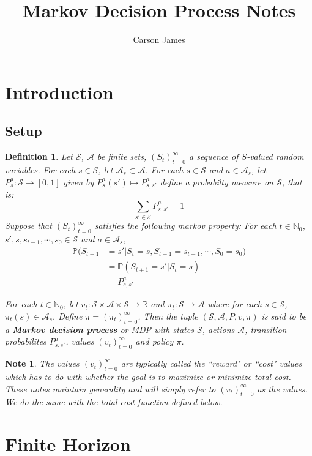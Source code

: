 \documentclass[12pt]{amsart}
\newtheorem{defn}[thm]{Definition}
\newtheorem{note}[thm]{Note}
\newcommand{\N}{\mathbb{N}}
\newcommand{\R}{\mathbb{R}}
\renewcommand{\P}{\mathbb{P}}
\newcommand{\MA}{\mathcal{A}}
\newcommand{\MS}{\mathcal{S}}
\begin{document}
\title{Markov Decision Process Notes}
\author[James]{Carson James}
\maketitle


\tableofcontents

\section{Introduction}

\subsection{Setup}
\begin{defn}
Let $\MS$, $\MA$ be finite sets, $(S_t)_{t=0}^{\infty}$ a sequence of $S$-valued random variables. For each $s \in \MS$, let $\MA_s \subset \MA$. For each $s \in \MS$ and $a \in \MA_s$, let $P^a_s: \MS \rightarrow [0,1]$ given by $P^a_s(s') \mapsto P^{a}_{s,s'}$ define a probabilty measure on $\MS$, that is: $$\sum_{s' \in \MS} P^{a}_{s,s'} = 1$$ Suppose that $(S_t)_{t=0}^{\infty}$ satisfies the following markov property: For each $t \in \N_0$, $s', s, s_{t-1}, \cdots, s_0 \in \MS$ and $a \in \MA_s$,
\begin{align*}
\P(S_{t+1} 
&= s'| S_t =s, S_{t-1} = s_{t-1}, \cdots, S_0=s_0) \\
&= \P(S_{t+1} = s'| S_t =s) \\
&= P^a_{s, s'}
\end{align*}

For each $t \in \N_0$, let $v_t: \MS \times \MA \times \MS  \rightarrow \R$ and $\pi_t:\MS \rightarrow \MA$ where for each $s \in \MS$, $\pi_t(s) \in \MA_s$. Define $\pi = (\pi_t)_{t=0}^{\infty}$. Then the tuple $(\MS, \MA, P, v, \pi)$ is said to be a \textbf{Markov decision process} or MDP with states $\MS$, actions $\MA$, transition probabilites $P^a_{s,s'}$, values $(v_t)_{t=0}^{\infty}$ and policy $\pi$.
\end{defn}

\begin{note}
The values $(v_t)_{t=0}^{\infty}$ are typically called the ``reward" or ``cost" values which has to do with whether the goal is to maximize or minimize total cost. These notes maintain generality and will simply refer to $(v_t)_{t=0}^{\infty}$ as the values. We do the same with the total cost function defined below.
\end{note}
\newpage
\section{Finite Horizon}
\end{document}
